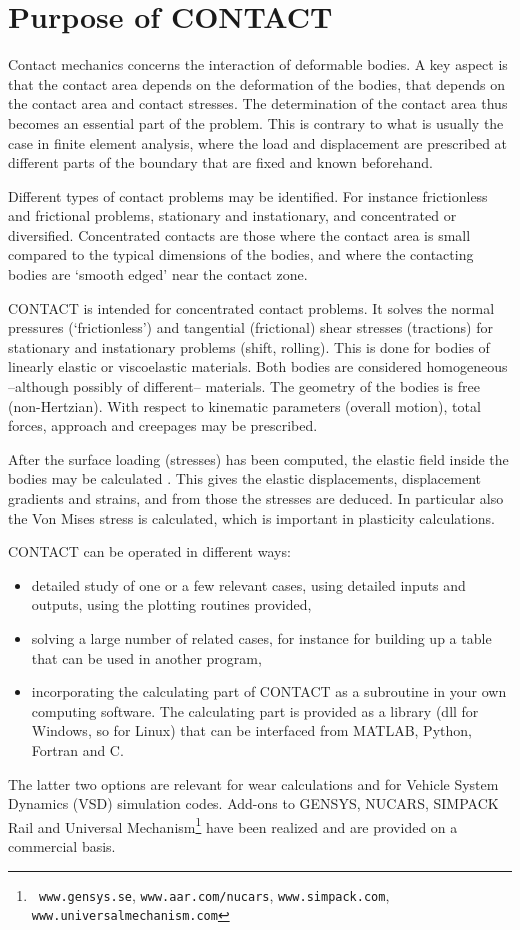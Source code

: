 \documentclass[12pt]{report}
\begin{document}
\section{Purpose of CONTACT}

Contact mechanics concerns the interaction of deformable bodies. A key
aspect is that the contact area depends on the deformation of the bodies,
that depends on the contact area and contact stresses. The determination of
the contact area thus becomes an essential part of the problem.
This is contrary to what is usually the case in finite element analysis,
where the load and displacement are prescribed at different parts of the
boundary that are fixed and known beforehand.

Different types of contact problems may be identified. For instance
frictionless and frictional problems, stationary and instationary, and
concentrated or diversified. Concentrated contacts are those where the
contact area is small compared to the typical dimensions of the bodies,
and where the contacting bodies are `smooth edged' near the contact zone.

CONTACT is intended for concentrated contact problems. It solves the normal
pressures (`frictionless') and tangential (frictional) shear stresses
(tractions) for stationary and instationary problems (shift, rolling). This
is done for bodies of linearly elastic or viscoelastic materials. Both
bodies are considered homogeneous --although possibly of different--
materials.  The geometry of the bodies is free (non-Hertzian).  With
respect to kinematic parameters (overall motion), total forces, approach
and creepages may be prescribed.

After the surface loading (stresses) has been computed, the elastic field
inside the bodies may be calculated \cite{Kalker1986a,Wekken2019a-subsurf}.
This gives the elastic displacements, displacement gradients and strains,
and from those the stresses are deduced. In particular also the Von Mises
stress is calculated, which is important in plasticity calculations.

CONTACT can be operated in different ways:
\begin{itemize}
\item detailed study of one or a few relevant cases, using detailed inputs
        and outputs, using the plotting routines provided,
\item solving a large number of related cases, for instance for building up
        a table that can be used in another program,
\item incorporating the calculating part of CONTACT as a subroutine in your
        own computing software. The calculating part is provided as a
        library (dll for Windows, so for Linux) that can be interfaced from
        MATLAB, Python, Fortran and C.
\end{itemize}
The latter two options are relevant for wear calculations and for Vehicle
System Dynamics (VSD) simulation codes. Add-ons to GENSYS, NUCARS, SIMPACK
Rail \cite{Vollebregt2011b-iavsd2011} and Universal Mechanism\footnote{{\tt
www.gensys.se}, {\tt www.aar.com/nucars}, {\tt www.simpack.com}, {\tt 
www.universalmechanism.com}} have been realized and are provided on a
commercial basis.
\end{document}
